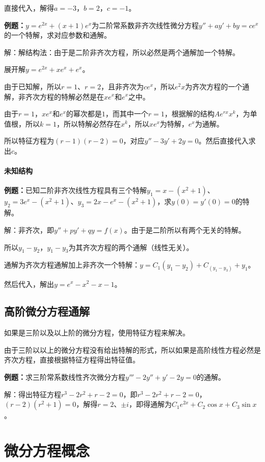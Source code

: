 直接代入，解得$a=-3$，$b=2$，$c=-1$。

\textbf{例题：}$y=e^{2x}+(x+1)e^x$为二阶常系数非齐次线性微分方程$y''+ay'+by=ce^x$的一个特解，求对应参数和通解。

解：解结构法：由于是二阶非齐次方程，所以必然是两个通解加一个特解。

展开解$y=e^{2x}+xe^x+e^x$。

由于已知解，所以$r=1$、$r=2$，且非齐次为$ce^x$，所以$e^2x$为齐次方程的一个通解，非齐次方程的特解必然是在$xe^x$和$e^x$之中。

由于$r=1$，$xe^x$和$e^x$的幂次都是$1$，而其中一个$r=1$，根据解的结构$Ae^{rx}x^k$，为单值根，所以$k=1$，所以特解必然存在$x^k$，所以$xe^x$为特解，$e^x$为通解。

所以特征方程为$(r-1)(r-2)=0$，对应$y''-3y'+2y=0$。然后直接代入求出$c$。

\paragraph{未知结构} \leavevmode \medskip

\textbf{例题：}已知二阶非齐次线性方程具有三个特解$y_1=x-(x^2+1)$、$y_2=3e^x-(x^2+1)$、$y_3=2x-e^x-(x^2+1)$，求$y(0)=y'(0)=0$的特解。

解：非齐次，即$y''+py'+qy=f(x)$。由于是二阶所以有两个无关的特解。

所以$y_1-y_2$，$y_1-y_3$为其齐次方程的两个通解（线性无关）。

通解为齐次方程通解加上非齐次一个特解：$y=C_1(y_1-y_2)+C_(y_1-y_3)+y_1$。

然后代入，解出$y=e^x-x^2-x-1$。

\subsection{高阶微分方程通解}

如果是三阶以及以上阶的微分方程，使用特征方程来解决。

由于三阶以以上的微分方程没有给出特解的形式，所以如果是高阶线性方程必然是齐次方程，直接根据特征方程得出特征值。

\textbf{例题：}求三阶常系数线性齐次微分方程$y'''-2y''+y'-2y=0$的通解。

解：得出特征方程$r^3-2r^2+r-2=0$，即$r^3-2r^2+r-2=0$，$(r-2)(r^2+1)=0$，解得$r=2$、$\pm i$，即得通解为$C_1e^{2x}+C_2\cos x+C_3\sin x$。

\section{微分方程概念}


